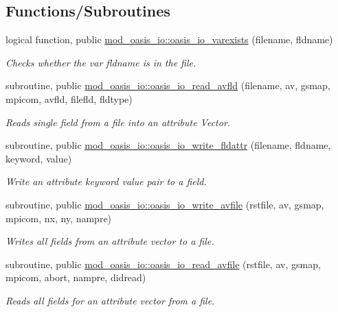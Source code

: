 \subsection*{Functions/\+Subroutines}
\begin{DoxyCompactItemize}
\item 
logical function, public \hyperlink{namespacemod__oasis__io_a4d0f5cb29eabc798e857127c8c174d85}{mod\+\_\+oasis\+\_\+io\+::oasis\+\_\+io\+\_\+varexists} (filename, fldname)
\begin{DoxyCompactList}\small\item\em Checks whether the var fldname is in the file. \end{DoxyCompactList}\item 
subroutine, public \hyperlink{namespacemod__oasis__io_a6c14bebb7b216218e25f599e3469ae0c}{mod\+\_\+oasis\+\_\+io\+::oasis\+\_\+io\+\_\+read\+\_\+avfld} (filename, av, gsmap, mpicom, avfld, filefld, fldtype)
\begin{DoxyCompactList}\small\item\em Reads single field from a file into an attribute Vector. \end{DoxyCompactList}\item 
subroutine, public \hyperlink{namespacemod__oasis__io_a9166ac9efbdf1146dc3c64677fd411b7}{mod\+\_\+oasis\+\_\+io\+::oasis\+\_\+io\+\_\+write\+\_\+fldattr} (filename, fldname, keyword, value)
\begin{DoxyCompactList}\small\item\em Write an attribute keyword value pair to a field. \end{DoxyCompactList}\item 
subroutine, public \hyperlink{namespacemod__oasis__io_ad8a48d6c36e3fac637a8191c20e514f2}{mod\+\_\+oasis\+\_\+io\+::oasis\+\_\+io\+\_\+write\+\_\+avfile} (rstfile, av, gsmap, mpicom, nx, ny, nampre)
\begin{DoxyCompactList}\small\item\em Writes all fields from an attribute vector to a file. \end{DoxyCompactList}\item 
subroutine, public \hyperlink{namespacemod__oasis__io_a65e17e4a065e8e4dea33754fb9c1d32c}{mod\+\_\+oasis\+\_\+io\+::oasis\+\_\+io\+\_\+read\+\_\+avfile} (rstfile, av, gsmap, mpicom, abort, nampre, didread)
\begin{DoxyCompactList}\small\item\em Reads all fields for an attribute vector from a file. \end{DoxyCompactList}\item 

\end{DoxyCompactItemize}
